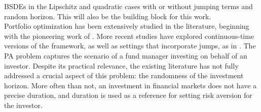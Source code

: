 \documentclass[11pt,a4paper]{article}
\theoremstyle{thmstyleone}%
\theoremstyle{thmstyletwo}%
\theoremstyle{thmstylethree}%
\begin{document}
BSDEs in the Lipschitz and quadratic cases with or without jumping terms and random horizon. This will also be the building block for this work.\\

Portfolio optimization has been extensively studied in the literature, beginning with the pioneering work of \cite{markowitz1991foundations}. More recent studies have explored continuous-time versions of the framework, as well as settings that incorporate jumps, as in \cite{morlais2009utility}. The PA problem captures the scenario of a fund manager investing on behalf of an investor. Despite its practical relevance, the existing literature has not fully addressed a crucial aspect of this problem: the randomness of the investment horizon. More often than not, an investment in financial markets does not have a precise duration, and duration is used as a reference for setting risk aversion for the investor. 
\end{document}

